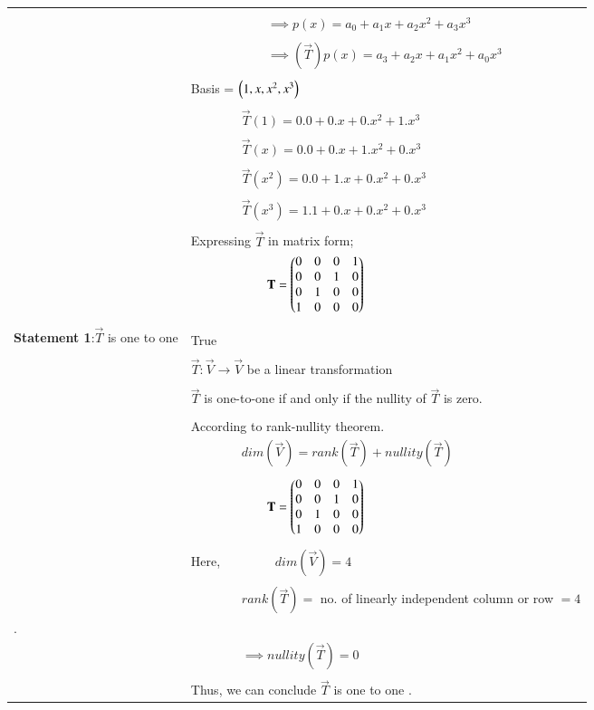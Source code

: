\documentclass[journal,12pt]{IEEEtran}
\begin{document}
\begin{longtable}{|p{5cm}|p{13cm}|}
	&\\
	& $\qquad\qquad\qquad\implies p(x)=a_0+a_1x+a_2x^{2}+a_3x^{3}$\\
	&\\
	& $\qquad\qquad\qquad\implies (\vec{T})p(x)=a_3+a_2x+a_1x^2+a_0x^3$\\
	&\\
	& Basis = $\left(1,x,x^2,x^3\right)$\\
	&\\
    & $\qquad\qquad\vec{T}(1) = 0.0+0.x+0.x^2+1.x^3$\\
    &\\
    & $\qquad\qquad\vec{T}(x) = 0.0+0.x+1.x^2+0.x^3$\\
    &\\
    & $\qquad\qquad\vec{T}(x^2) = 0.0+1.x+0.x^2+0.x^3$\\
    &\\
    & $\qquad\qquad\vec{T}(x^3) = 1.1+0.x+0.x^2+0.x^3$\\
    &\\
    & Expressing $\vec{T}$ in matrix form;\\
    \hline
    & $\qquad\qquad\qquad\mathbf{T}=\begin{pmatrix}0&0&0&1\\0&0&1&0\\0&1&0&0\\1&0&0&0\end{pmatrix}$\\
	&\\
	\hline
	\multirow{3}{*}{\textbf{Statement 1}:$\vec{T}$ is one to one } & \\
	& True\\
	\hline
	&\\
	& $\vec{T}:\vec{V}\rightarrow\vec{V}$ be a linear transformation\\
	&\\
	& $\vec{T}$ is one-to-one if and only if the nullity of $\vec{T}$ is zero.\\
	&\\
	& According to rank-nullity theorem.\\
    & $\qquad\qquad dim(\vec{V})=rank(\vec{T})+nullity(\vec{T})$\\
    &\\
    & $\qquad\qquad\qquad\mathbf{T}=\begin{pmatrix}0&0&0&1\\0&0&1&0\\0&1&0&0\\1&0&0&0\end{pmatrix}$\\
	&\\
	& Here, $\qquad\qquad dim(\vec{V}) = 4$\\
	&\\
	& $\qquad\qquad rank(\vec{T})=$ no. of linearly independent column or row $=4$\\.
	&\\
	& $\qquad\qquad\implies nullity (\vec{T}) = 0$\\
	&\\
	& Thus, we can conclude $\vec{T}$ is one to one .\\
	  

\end{longtable}
\end{document}
